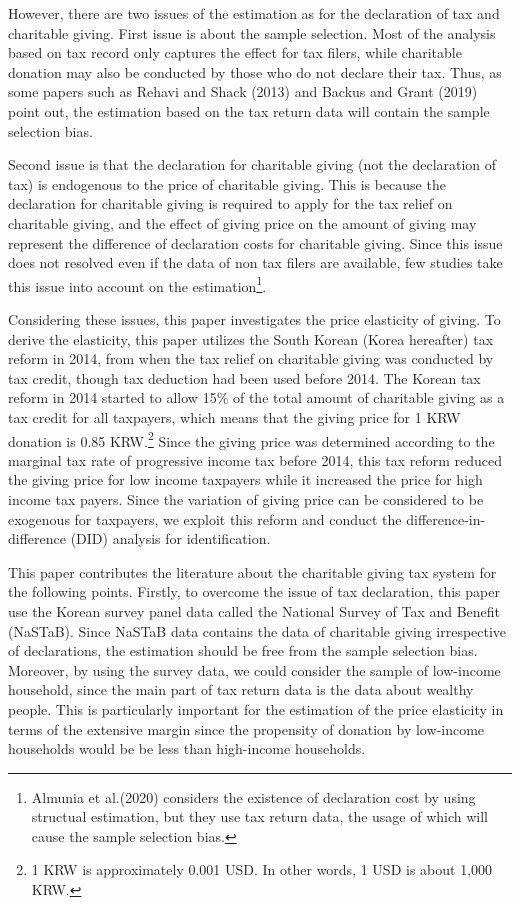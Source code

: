 \documentclass[
  11pt,
  a4paper,
]{article}
\begin{document}
However, there are two issues of the estimation as for the declaration of tax and charitable giving.
First issue is about the sample selection. Most of the analysis based on tax record only captures the effect for tax filers, while charitable donation may also be conducted by those who do not declare their tax. Thus, as some papers such as Rehavi and Shack (2013) and Backus and Grant (2019) point out, the estimation based on the tax return data will contain the sample selection bias.

Second issue is that the declaration for charitable giving (not the declaration of tax) is endogenous to the price of charitable giving. This is because the declaration for charitable giving is required to apply for the tax relief on charitable giving, and the effect of giving price on the amount of giving may represent the difference of declaration costs for charitable giving. Since this issue does not resolved even if the data of non tax filers are available, few studies take this issue into account on the estimation\footnote{Almunia et al.(2020) considers the existence of declaration cost by using structual estimation, but they use tax return data, the usage of which will cause the sample selection bias.}.

Considering these issues, this paper investigates the price elasticity of giving. To derive the elasticity, this paper utilizes the South Korean (Korea hereafter) tax reform in 2014, from when the tax relief on charitable giving was conducted by tax credit, though tax deduction had been used before 2014.
The Korean tax reform in 2014 started to allow 15\% of the total amount of charitable giving as a tax credit for all taxpayers, which means that the giving price for 1 KRW donation is 0.85 KRW.\footnote{1 KRW is approximately 0.001 USD. In other words, 1 USD is about 1,000 KRW.} Since the giving price was determined according to the marginal tax rate of progressive income tax before 2014, this tax reform reduced the giving price for low income taxpayers while it increased the price for high income tax payers. Since the variation of giving price can be considered to be exogenous for taxpayers, we exploit this reform and conduct the difference-in-difference (DID) analysis for identification.

This paper contributes the literature about the charitable giving tax system for the following points. Firstly, to overcome the issue of tax declaration, this paper use the Korean survey panel data called the National Survey of Tax and Benefit (NaSTaB). Since NaSTaB data contains the data of charitable giving irrespective of declarations, the estimation should be free from the sample selection bias. Moreover, by using the survey data, we could consider the sample of low-income household, since the main part of tax return data is the data about wealthy people. This is particularly important for the estimation of the price elasticity in terms of the extensive margin since the propensity of donation by low-income households would be be less than high-income households.
\end{document}
